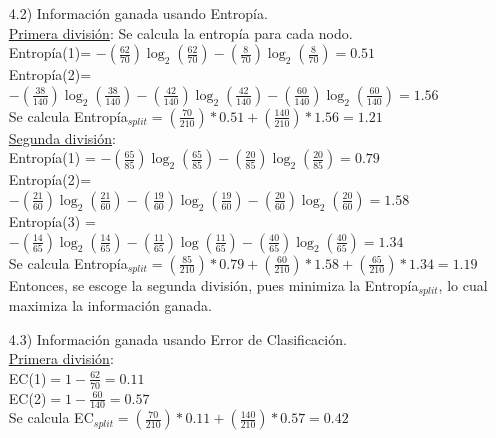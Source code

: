 \documentclass[11pt,a4paper]{report}
\begin{document}
\begin{itemize}
\item[4.2)] Información ganada usando Entropía. \\

\underline{Primera división}: Se calcula la entropía para cada nodo. \\

Entropía(1)= $-(\frac{62}{70})\log_2(\frac{62}{70})-(\frac{8}{70})\log_2(\frac{8}{70}) = 0.51$\\

Entropía(2)= $-(\frac{38}{140})\log_2(\frac{38}{140})-(\frac{42}{140})\log_2(\frac{42}{140}) - (\frac{60}{140})\log_2(\frac{60}{140}) =1.56$\\

Se calcula Entropía$_{split}=(\frac{70}{210})*0.51 + (\frac{140}{210})*1.56 = 1.21$\\ 

\underline{Segunda división}: \\

Entropía(1) = $-(\frac{65}{85})\log_2(\frac{65}{85})-(\frac{20}{85})\log_2(\frac{20}{85}) = 0.79$ \\

Entropía(2)=$-(\frac{21}{60})\log_2(\frac{21}{60})-(\frac{19}{60})\log_2(\frac{19}{60}) - (\frac{20}{60})\log_2(\frac{20}{60})=1.58$\\

Entropía(3) = $-(\frac{14}{65})\log_2(\frac{14}{65})-(\frac{11}{65})\log(\frac{11}{65}) - (\frac{40}{65})\log_2(\frac{40}{65}) =1.34$ \\

Se calcula Entropía$_{split}=(\frac{85}{210})*0.79 + (\frac{60}{210})*1.58 + (\frac{65}{210})*1.34 = 1.19$\\  

Entonces, se escoge la segunda división, pues minimiza la Entropía$_{split}$, lo cual maximiza la información ganada.

\item[4.3)] Información ganada usando Error de Clasificación.\\

\underline{Primera división}:\\

EC(1)$=1-\frac{62}{70}=0.11$ \\

EC(2)$=1-\frac{60}{140}=0.57$\\

Se calcula EC$_{split}=(\frac{70}{210})*0.11 + (\frac{140}{210})*0.57 = 0.42$\\


\end{itemize}
\end{document}
